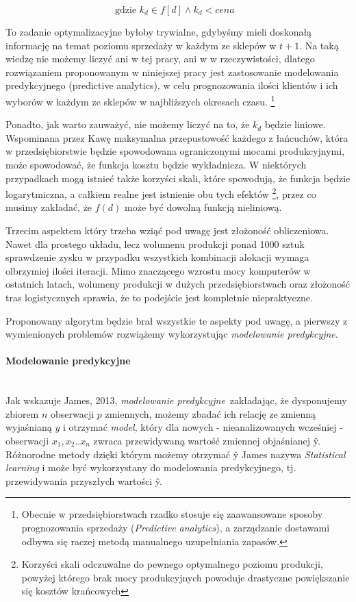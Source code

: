 \documentclass{article}
\begin{document}
\begin{equation*}
 \text{gdzie $k_d \in f[d] \wedge k_d < cena $ }
\end{equation*}

To zadanie optymalizacyjne byłoby trywialne, gdybyśmy mieli doskonałą informację na temat poziomu sprzedaży w każdym ze sklepów w $ t + 1 $. Na taką wiedzę nie możemy liczyć ani w tej pracy, ani w w rzeczywistości, dlatego rozwiązaniem proponowanym w niniejszej pracy jest zastosowanie modelowania predykcyjnego (predictive analytics), w celu prognozowania ilości klientów i ich wyborów w każdym ze sklepów w najbliższych okresach czasu. \footnote{Obecnie w przedsiębiorstwach rzadko stosuje się zaawansowane sposoby prognozowania sprzedaży (\textit{Predictive analytics}), a zarządzanie dostawami odbywa się raczej metodą manualnego uzupełniania zapasów.} 

Ponadto, jak warto zauważyć, nie możemy liczyć na to, że $k_d$ będzie liniowe. Wspominana przez Kawę maksymalna przepustowość każdego z łańcuchów, która w przedsiębiorstwie będzie spowodowana ograniczonymi mocami produkcyjnymi, może spowodować, że funkcja kosztu będzie wykładnicza. W niektórych przypadkach mogą istnieć także korzyści skali, które spowodują, że funkcja będzie logarytmiczna, a całkiem realne jest istnienie obu tych efektów  \footnote{Korzyści skali odczuwalne do pewnego optymalnego poziomu produkcji, powyżej którego brak mocy produkcyjnych powoduje drastyczne powiększanie się kosztów krańcowych}, przez co musimy zakładać, że $f(d)$ może być dowolną funkcją nieliniową.

Trzecim aspektem który trzeba wziąć pod uwagę jest złożoność obliczeniowa. Nawet dla prostego układu, lecz wolumenu produkcji ponad 1000 sztuk sprawdzenie zysku w przypadku wszystkich kombinacji alokacji wymaga olbrzymiej ilości iteracji. Mimo znaczącego wzrostu mocy komputerów w ostatnich latach, wolumeny produkcji w dużych przedsiębiorstwach oraz złożoność tras logistycznych sprawia, że to podejście jest kompletnie niepraktyczne. 

 Proponowany algorytm będzie brał wszystkie te aspekty pod uwagę, a pierwszy z wymienionych problemów rozwiążemy wykorzystując  \textit{modelowanie predykcyjne}.

\paragraph{Modelowanie predykcyjne} \mbox{}\\
Jak wskazuje James, 2013, \textit{modelowanie predykcyjne}\ zakładając, że dysponujemy zbiorem $n$ obserwacji $p$ zmiennych, możemy zbadać ich relację ze zmienną wyjaśnianą $y$ i otrzymać \textit{model}, który dla nowych - nieanalizowanych wcześniej - obserwacji $x_1,x_2..x_n$  zwraca przewidywaną wartość zmiennej objaśnianej \^{y}. Różnorodne metody dzięki którym możemy otrzymać \^{y} James nazywa \textit{Statistical learning} i może być wykorzystany do modelowania predykcyjnego, tj. przewidywania przyszłych wartości \^{y}. 
\end{document}
